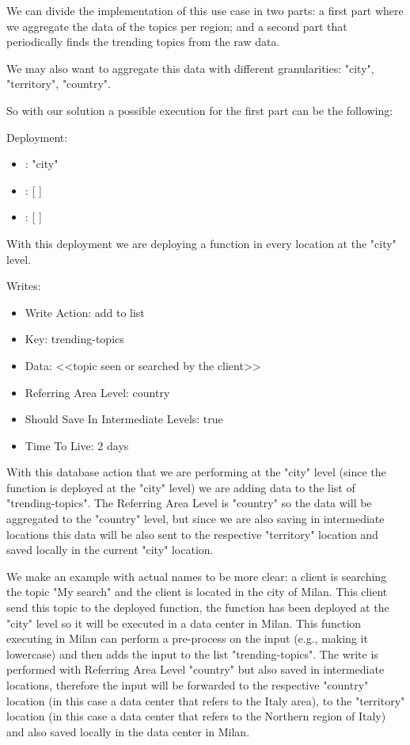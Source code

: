 We can divide the implementation of this use case in two parts: a first part where we aggregate the data of the topics per region; and a second part that periodically finds the trending topics from the raw data.

We may also want to aggregate this data with different granularities: "city", "territory", "country".

So with our solution a possible execution for the first part can be the following:
\begin{example}
Deployment:
\begin{itemize}
    \item {}: "city"
    \item {}: [ ]
    \item {}: [ ]
\end{itemize}
With this deployment we are deploying a function in every location at the "city" level.

Writes:
\begin{itemize}
    \item Write Action: add to list
    \item Key: trending-topics
    \item Data: <<topic seen or searched by the client>>
    \item Referring Area Level: country
    \item Should Save In Intermediate Levels: true
    \item Time To Live: 2 days
\end{itemize}
With this database action that we are performing at the "city" level (since the function is deployed at the "city" level) we are adding data to the list of "trending-topics". The Referring Area Level is "country" so the data will be aggregated to the "country" level, but since we are also saving in intermediate locations this data will be also sent to the respective "territory" location and saved locally in the current "city" location.

We make an example with actual names to be more clear: a client is searching the topic "My search" and the client is located in the city of Milan. This client send this topic to the deployed function, the function has been deployed at the "city" level so it will be executed in a data center in Milan. This function executing in Milan can perform a pre-process on the input (e.g., making it lowercase) and then adds the input to the list "trending-topics". The write is performed with Referring Area Level "country" but also saved in intermediate locations, therefore the input will be forwarded to the respective "country" location (in this case a data center that refers to the Italy area), to the "territory" location (in this case a data center that refers to the Northern region of Italy) and also saved locally in the data center in Milan.
\end{example}

